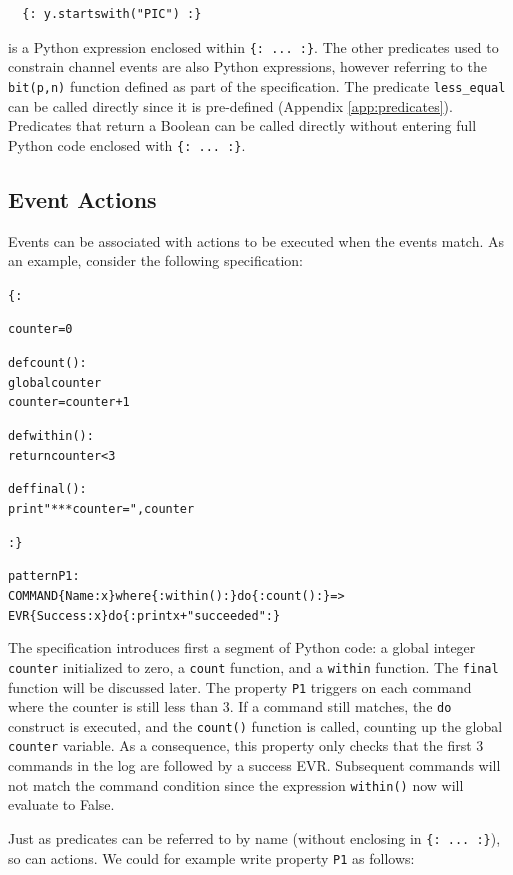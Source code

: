 \documentclass{report}
\newcommand{\python}{{\sc Python}}
\newenvironment{code}[1] %
{
\vspace{0.5cm}
\begin{center}
\begin{Sbox}
\begin{minipage}{11cm}
\begin{alltt}
{\bf\em #1}
}
{
\end{alltt}
\end{minipage}
\end{Sbox}
\setlength{\fboxsep}{8pt}
\fbox{\TheSbox}
\end{center}
\vspace{0.5cm}
}
\begin{document}
\begin{verbatim} 
  {: y.startswith("PIC") :} 
\end{verbatim} 
 
\noindent is a \python{} expression enclosed within {\tt \{: ... :\}}. The other 
predicates used to constrain channel events are also \python{} expressions, however referring to the {\tt bit(p,n)} function
defined as part of the specification. The predicate {\tt less\_equal} can be called directly since it is pre-defined
(Appendix \ref{app:predicates}). Predicates that return a Boolean can be called directly without entering full \python{}
code enclosed with {\tt \{: ... :\}}.
  
  
\subsection{Event Actions}

Events can be associated with actions to be executed when the events match. As an example, consider
the following specification:

\begin{code}{}
\{:

counter = 0

def count():
    global counter
    counter = counter + 1
  
def within():
    return counter < 3  

def final():
    print "*** counter =" , counter

:\}

pattern P1 :
  COMMAND\{Name : x\} where \{: within() :\} do \{: count() :\} => 
    EVR\{Success : x\} do \{: print x + " succeeded" :\}
\end{code}

\noindent The specification introduces first a segment of \python{} code: a global integer {\tt counter}
initialized to zero, a {\tt count} function, and a {\tt within} function. The {\tt final} function will be discussed later. The property {\tt P1} triggers on each command where the counter is still less than 3. If a command
still matches, the {\tt do} construct is executed, and the {\tt count()} function is called, counting up the global
{\tt counter} variable. As a consequence, this property only checks that  the first 3 commands in the log are followed by a success EVR. Subsequent commands will not match the command condition since the expression {\tt within()} now will evaluate to False. 

Just as predicates can be referred to by name (without enclosing in \verb+{: ... :}+), so can actions.
We could for example write property {\tt P1} as follows:
\end{document}
